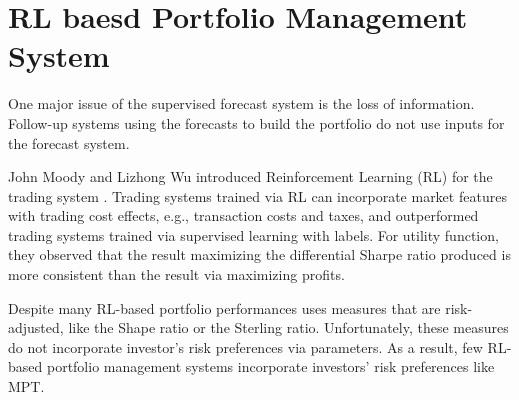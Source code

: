 \section{RL baesd Portfolio Management System}
One major issue of the supervised forecast system is the loss of information. Follow-up systems using the forecasts to build the portfolio do not use inputs for the forecast system.
\par
John Moody and Lizhong Wu introduced Reinforcement Learning (RL) for the trading system \cite{618952}. Trading systems trained via RL can incorporate market features with trading cost effects, e.g., transaction costs and taxes, and outperformed trading systems trained via supervised learning with labels. For utility function, they observed that the result maximizing the differential Sharpe ratio produced is more consistent than the result via maximizing profits\cite{618952}.
\par
Despite many RL-based portfolio performances uses measures that are risk-adjusted\cite{cogneau2009101}, like the Shape ratio\cite{Sharpe49} or the Sterling ratio\cite{magdon2004maximum}. Unfortunately, these measures do not incorporate investor's risk preferences via parameters. As a result, few RL-based portfolio management systems incorporate investors' risk preferences like MPT. 